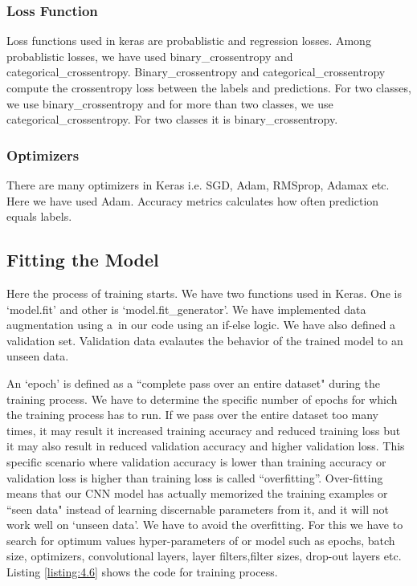\subsubsection*{Loss Function}
Loss functions used in keras are probablistic and regression losses. 
Among probablistic losses, we have used binary\_crossentropy and
categorical\_crossentropy. Binary\_crossentropy and categorical\_crossentropy
compute the crossentropy loss between the labels and predictions.
For two classes, we use binary\_crossentropy and for 
more than two classes, we use categorical\_crossentropy. For two
classes it is binary\_crossentropy. 
\subsubsection*{Optimizers}
There are many optimizers in Keras i.e.
SGD, Adam, RMSprop, Adamax etc. Here we have used Adam. Accuracy metrics calculates how
often prediction equals labels.
\subsection{Fitting the Model}
Here the process of training starts. We have two functions used in Keras. One
is `model.fit' and other is `model.fit\_generator'. We have implemented data augmentation using a\
in our code using an if-else logic. We have also defined a validation set.
Validation data evalautes the behavior of the trained model to an unseen data.

An `epoch' is defined as a ``complete pass over an entire dataset" during the training process.
We have to determine the specific number of epochs for which the training process has to
run. If we pass over the entire dataset too many times,
it may result it increased training accuracy and reduced training loss
but it may also result in reduced validation accuracy and higher validation loss.
This specific scenario where validation accuracy is lower
than training accuracy or validation loss is higher  than
training loss is called ``overfitting''. Over-fitting means that our
CNN model has actually memorized the training examples or ``seen data"
instead of learning discernable parameters from it,
and it will not work well on `unseen data'. We have to avoid the overfitting. For this we have to search for
optimum values hyper-parameters of or model such as epochs,
batch size, optimizers, convolutional layers,
layer filters,filter sizes, drop-out layers etc.
Listing \ref{listing:4.6} shows the code for training process.

